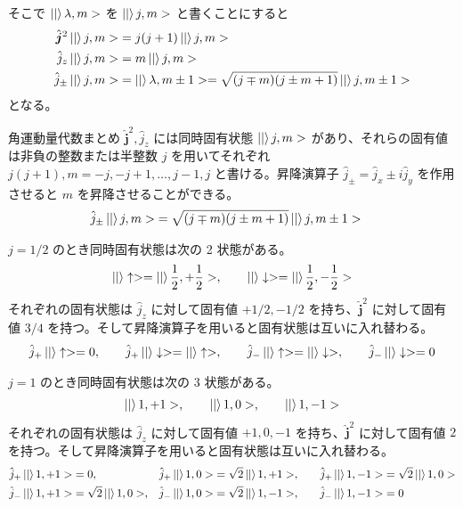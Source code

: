 \documentclass[uplatex,dvipdfmx,a4paper,11pt]{jlreq}
\numberwithin{equation}{section}
\theoremstyle{definition}
\begin{document}
そこで $\ket|\lambda, m>$ を $\ket|j, m>$ と書くことにすると
\begin{align}
  \hat{\bm{j}}^2\ket|j, m> & = j(j + 1)\ket|j, m>                                                  \\
  \hat{j}_z\ket|j, m>      & = m\ket|j, m>                                                         \\
  \hat{j}_\pm\ket|j, m>    & = \ket|\lambda, m\pm 1> = \sqrt{(j \mp m)(j \pm m + 1)}\ket|j, m\pm1>
\end{align}
となる。

\begin{itembox}[l]{角運動量代数まとめ}
  $\hat{\bm{j}}^2, \hat{j}_z$ には同時固有状態 $\ket|j, m>$ があり、それらの固有値は非負の整数または半整数 $j$ を用いてそれぞれ $j(j+1), m = -j,-j+1,\ldots,j-1,j$ と書ける。昇降演算子 $\hat{j}_\pm = \hat{j}_x \pm i\hat{j}_y$ を作用させると $m$ を昇降させることができる。
  \begin{align}
    \hat{j}_\pm\ket|j, m> & = \sqrt{(j \mp m)(j \pm m + 1)}\ket|j, m\pm1>
  \end{align}
\end{itembox}

\begin{proposition}
  $j = 1/2$ のとき同時固有状態は次の 2 状態がある。
  \begin{align}
    \ket|\uparrow> = \ket|\frac{1}{2}, +\frac{1}{2}>, \qquad \ket|\downarrow> = \ket|\frac{1}{2}, -\frac{1}{2}>
  \end{align}
  それぞれの固有状態は $\hat{j}_z$ に対して固有値 $+1/2, -1/2$ を持ち、$\hat{\bm{j}}^2$ に対して固有値 $3/4$ を持つ。そして昇降演算子を用いると固有状態は互いに入れ替わる。
  \begin{align}
    \hat{j}_+\ket|\uparrow> = 0, \qquad \hat{j}_+\ket|\downarrow> = \ket|\uparrow>, \qquad \hat{j}_-\ket|\uparrow> = \ket|\downarrow>, \qquad \hat{j}_-\ket|\downarrow> = 0
  \end{align}
\end{proposition}
\begin{proposition}
  $j = 1$ のとき同時固有状態は次の 3 状態がある。
  \begin{align}
    \ket|1, +1>, \qquad \ket|1, 0>, \qquad \ket|1, -1>
  \end{align}
  それぞれの固有状態は $\hat{j}_z$ に対して固有値 $+1, 0, -1$ を持ち、$\hat{\bm{j}}^2$ に対して固有値 $2$ を持つ。そして昇降演算子を用いると固有状態は互いに入れ替わる。
  \begin{align}
    \begin{alignedat}{3}
      \hat{j}_+\ket|1, +1> &= 0, & \hat{j}_+\ket|1, 0> &= \sqrt{2}\ket|1, +1>, \qquad & \hat{j}_+\ket|1, -1> &= \sqrt{2}\ket|1, 0> \\
      \hat{j}_-\ket|1, +1> &= \sqrt{2}\ket|1, 0>, \quad & \hat{j}_-\ket|1, 0> &= \sqrt{2}\ket|1, -1>, & \hat{j}_-\ket|1, -1> &= 0
    \end{alignedat}
  \end{align}
\end{proposition}
\end{document}
